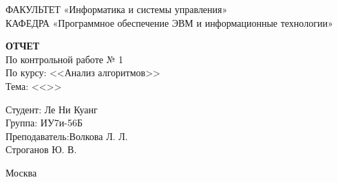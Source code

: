 \begin{titlepage}
	{\doublespacing \normalsize \raggedright ФАКУЛЬТЕТ \hspace{25mm} «Информатика и системы управления»\\
	КАФЕДРА \hspace{5mm} «Программное обеспечение ЭВМ и информационные технологии»\\}

	\vspace{30mm}
	
	\textbf{ОТЧЕТ}\\
	По контрольной работе № 1\\
	По курсу: <<Анализ алгоритмов>>\\
	Тема: <<\topic>>\\

	\vspace{60mm}

	\hspace{70mm} Студент:      \hfill Ле Ни Куанг\\
	\hspace{70mm} Группа:       \hfill ИУ7и-56Б\\
	\hspace{70mm} Преподаватель:\hfill Волкова Л. Л.\\
								\hfill Строганов Ю. В.\\

	\vfill
	
	Москва\\
	\the\year
\end{titlepage}
